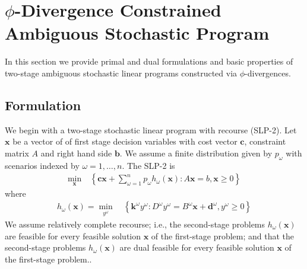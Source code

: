 \documentclass[ijoc,letterpaper]{informs3} %
\newcommand{\x}{\mathbf{x}}
\renewcommand{\c}{\mathbf{c}}
\renewcommand{\k}{\mathbf{k}}
\renewcommand{\b}{\mathbf{b}}
\renewcommand{\d}{\mathbf{d}}
\newcommand{\st}{\mbox{s.t.}}
\begin{document}
\section{$\phi$-Divergence Constrained Ambiguous Stochastic Program}
\label{sec:plp2}

In this section we provide primal and dual formulations and basic properties of two-stage ambiguous stochastic linear programs constructed via $\phi$-divergences.

\subsection{Formulation}
\label{ssec:form}

We begin with a two-stage stochastic linear program with recourse (SLP-2).
Let $\x$ be a vector of of first stage decision variables with cost vector $\c$, constraint matrix $A$ and right hand side $\b$.
We assume a finite distribution given by $p_\omega$ with scenarios indexed by $\omega = 1, \dots, n$.
The SLP-2 is
\begin{align}
	\min_\x \ & \left\{ \c\x + \sum_{\omega=1}^n p_\omega h_\omega(\x) : A\x = b, \x \geq 0 \right\} \label{eq:slp_first_stage}%
\end{align}
where
\begin{align}
	h_\omega(\x) = \min_{y^\omega} \ & \left\{ \k^\omega y^\omega : D^\omega y^\omega = B^\omega \x + \d^\omega, y^\omega \geq 0 \right\} \label{eq:slp_second_stage}
\end{align}
We assume relatively complete recourse; i.e., the second-stage problems $h_\omega(\x)$ are feasible for every feasible solution $\x$ of the first-stage problem; and that the second-stage problems $h_\omega(\x)$ are dual feasible for every feasible solution $\x$ of the first-stage problem..
\end{document}
